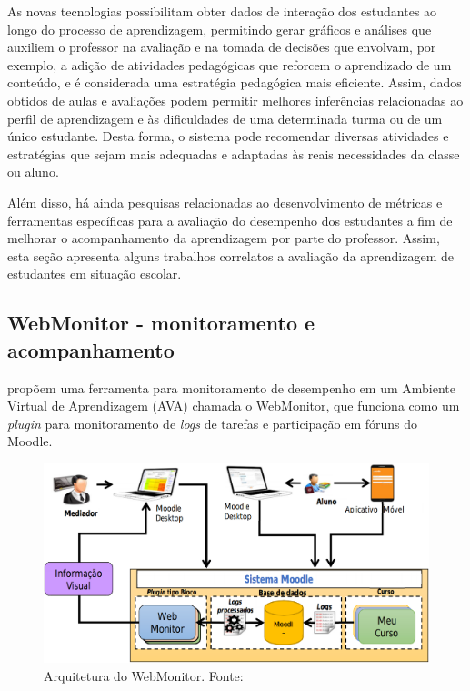 As novas tecnologias possibilitam obter dados de interação dos estudantes ao longo do processo de aprendizagem, permitindo gerar gráficos e análises que auxiliem o professor na avaliação e na tomada de decisões que envolvam, por exemplo, a adição de atividades pedagógicas que reforcem o aprendizado de um conteúdo, e é considerada uma estratégia pedagógica mais eficiente.
Assim, dados obtidos de aulas e avaliações podem permitir melhores inferências relacionadas ao perfil de aprendizagem e às dificuldades de uma determinada turma ou de um único estudante. Desta forma, o sistema pode recomendar diversas atividades e estratégias que sejam mais adequadas e adaptadas às reais necessidades da classe ou aluno.

Além disso, há ainda pesquisas relacionadas ao desenvolvimento de métricas e ferramentas específicas para a avaliação do desempenho dos estudantes a fim de melhorar o acompanhamento da aprendizagem por parte do professor. 
Assim, esta seção apresenta alguns trabalhos correlatos a avaliação da aprendizagem de estudantes em situação escolar.


\subsection{WebMonitor - monitoramento e acompanhamento}
\cite{Lucena:2015} propõem uma ferramenta para monitoramento de desempenho em um Ambiente Virtual de Aprendizagem (AVA) chamada o WebMonitor, que funciona como um \textit{plugin} para monitoramento de \textit{logs} de tarefas e participação em fóruns do Moodle.

\begin{figure}[htb]
	\centering
	\includegraphics[width=0.9\linewidth]{chapters/works/Lucena2015_5162-6882-1-PB_arquitetura.png}
	\caption{Arquitetura do WebMonitor. Fonte:~\cite{Lucena:2015}}
	\label{fig:Lucena2015_Arquitetura}
\end{figure}

